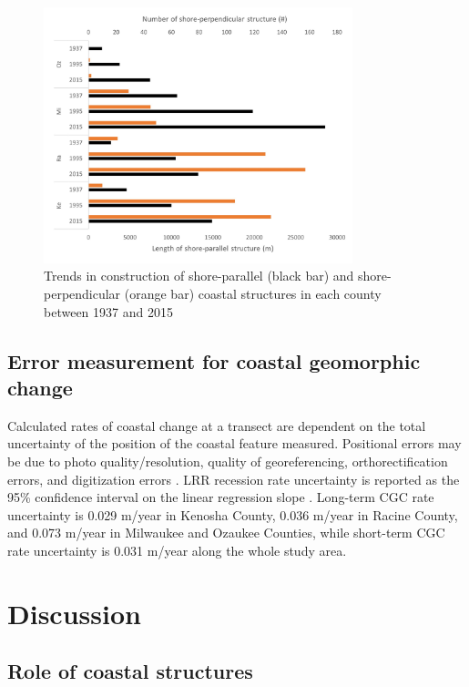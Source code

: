\begin{figure}[htbp] \centering
\includegraphics[width=0.8\textwidth]{chapter2/resources/figure2-5.jpg}
\caption{Trends in construction of shore-parallel (black bar) and
shore-perpendicular (orange bar) coastal structures in each county between 1937
and 2015} 
\label{fig:fig2.5} 
\end{figure}

\subsection{Error measurement for coastal geomorphic change} 
\label{Error measurement for coastal geomorphic change} 

Calculated rates of coastal change at a transect are dependent on the total
uncertainty of the position of the coastal feature measured. Positional errors
may be due to photo quality/resolution, quality of georeferencing,
orthorectification errors, and digitization errors \citep{del_rio_error_2013}.
LRR recession rate uncertainty is reported as the 95\% confidence interval on
the linear regression slope \citep{thieler2009digital}.  Long-term CGC rate
uncertainty is 0.029 m/year in Kenosha County, 0.036 m/year in Racine County,
and 0.073 m/year in Milwaukee and Ozaukee Counties, while short-term CGC rate
uncertainty is 0.031 m/year along the whole study area. 


\section{Discussion} 
\label{Discussion}

\subsection{Role of coastal structures} 
\label{Role of coastal structures}

